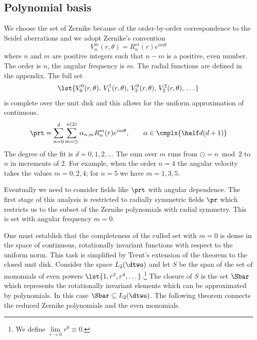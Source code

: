 \documentclass[final,leqno,onefignum,onetabnum]{siamltex1213}
\begin{document}
\subsection{Polynomial basis}  %
We choose the set of Zernike because of the order-by-order correspondence to the Seidel aberrations and we adopt Zernike's convention
  \begin{equation}
    V_{n}^{m} (r, \theta ) = R_{n}^{m}(r) e^{i m \theta}
    \label{eq:Zernike separation}
  \end{equation}
where $n$ and $m$ are positive integers such that $n-m$ is a positive, even number. The order is $n$, the angular frequency is $m$. The radial functions are defined in  the appendix. The full set 
$$\lst{V_{0}^{0} (r, \theta ),\, V_{1}^{1} (r, \theta ),\, V_{2}^{0} (r, \theta ),\, V_{2}^{2} (r, \theta ),\, \dots}$$ 
is complete\cite{complete} over the unit disk and this allows for the uniform approximation of continuous.
  \begin{equation}
    \prt = \sum_{n=0}^{d} \sum_{m=\odot}^{n(2)} \alpha_{n,m} R_{n}^{m}(r) e^{i m \theta}, \qquad \alpha \in \cmplx{\half d (d+1)}
    \label{eq:Zernike expansion}
  \end{equation}
The degree of the fit is $d=0,1,2,\dots$ The sum over $m$ runs from $\odot=n\bmod 2$ to $n$ in increments of 2. For example, when the order $n=4$ the angular velocity takes the values $m=0,2,4$; for $n=5$ we have $m=1,3,5$.

Eventually we need to consider fields like $\prt$ with angular dependence. The first stage of this analysis is restricted to radially symmetric fields $\pr$ which restricts us to the subset of the Zernike polynomials with radial symmetry. This is set with angular frequency $m=0$.

One must establish that the completeness of the culled set with $m=0$ is dense in the space of continuous, rotationally invariant functions with respect to the uniform norm. This task is simplified by Trent's extension  \cite{Trent} of the \ms theorem to the closed unit disk. Consider the space $L_{2}(\dtwo)$ and let $S$ be the span of the set of monomials of even powers $\lst{1,r^{2},r^{4},\dots}$.\footnote{We define $\lim\limits_{r\to0}r^{0}\equiv0$.} The closure of $S$ is the set $\Sbar$ which represents the rotationally invariant elements which can be approximated by polynomials. In this case $\Sbar \subseteq L_{2}(\dtwo)$. The following theorem connects the reduced Zernike polynomials and the even monomials.
\end{document}
